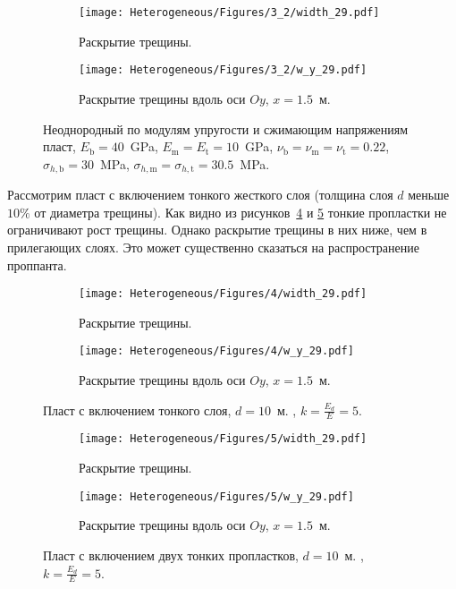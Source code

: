 \begin{figure}[htbp]
    \centering
    \begin{subfigure}[t]{0.4\textwidth}
        \centering
        \caption{Раскрытие трещины.}
        \label{fig:comparison-2-planar}
        \texttt{[image: Heterogeneous/Figures/3\_2/width\_29.pdf]}
    \end{subfigure}
    \hfill 
    \begin{subfigure}[t]{0.55\textwidth}
        \centering
        \caption{Раскрытие трещины вдоль оси $Oy$, $x=1.5$~м.}
        \label{fig:comparison-2-slice}
        \texttt{[image: Heterogeneous/Figures/3\_2/w\_y\_29.pdf]}
    \end{subfigure}
    \caption{Неоднородный по модулям упругости и сжимающим напряжениям пласт, $E_\text{b} = 40$~GPa, $E_\text{m} = E_\text{t} = 10$~GPa, $\nu_\text{b} = \nu_\text{m} = \nu_\text{t} = 0.22$, $\sigma_{h,\text{b}} = 30$~MPa, $\sigma_{h,\text{m}} = \sigma_{h,\text{t}} = 30.5$~MPa.}
    \label{fig:comparison-2}
\end{figure}


Рассмотрим пласт с включением тонкого жесткого слоя (толщина слоя $d$ меньше $10\%$ от диаметра трещины). Как видно из рисунков~\ref{fig:thin-layer-1} и \ref{fig:thin-layer-2} тонкие пропластки не ограничивают рост трещины. Однако раскрытие трещины в них ниже, чем в прилегающих слоях. Это может существенно сказаться на распространение проппанта. 
\begin{figure}[htbp]
    \centering
    \begin{subfigure}[t]{0.4\textwidth}
        \centering
        \caption{Раскрытие трещины.}
        \texttt{[image: Heterogeneous/Figures/4/width\_29.pdf]}
    \end{subfigure}
    \hfill 
    \begin{subfigure}[t]{0.55\textwidth}
        \centering
        \caption{Раскрытие трещины вдоль оси $Oy$, $x=1.5$~м.}
        \texttt{[image: Heterogeneous/Figures/4/w\_y\_29.pdf]}
    \end{subfigure}
    \caption{Пласт с включением тонкого слоя, $d=10$~м. , $k=\frac{E_d}{E}=5$.}
    \label{fig:thin-layer-1}
\end{figure}

\begin{figure}[htbp]
    \centering
    \begin{subfigure}[t]{0.4\textwidth}
        \centering
        \caption{Раскрытие трещины.}
        \texttt{[image: Heterogeneous/Figures/5/width\_29.pdf]}
    \end{subfigure}
    \hfill 
    \begin{subfigure}[t]{0.55\textwidth}
        \centering
        \caption{Раскрытие трещины вдоль оси $Oy$, $x=1.5$~м.}
        \texttt{[image: Heterogeneous/Figures/5/w\_y\_29.pdf]}
    \end{subfigure}
    \caption{Пласт с включением двух тонких пропластков, $d=10$~м. , $k=\frac{E_d}{E}=5$.}
    \label{fig:thin-layer-2}
\end{figure}